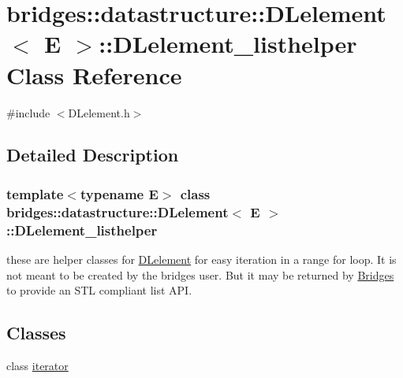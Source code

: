 \hypertarget{classbridges_1_1datastructure_1_1_d_lelement_1_1_d_lelement__listhelper}{}\section{bridges\+:\+:datastructure\+:\+:D\+Lelement$<$ E $>$\+:\+:D\+Lelement\+\_\+listhelper Class Reference}
\label{classbridges_1_1datastructure_1_1_d_lelement_1_1_d_lelement__listhelper}


{\ttfamily \#include $<$D\+Lelement.\+h$>$}



\subsection{Detailed Description}
\subsubsection*{template$<$typename E$>$\newline
class bridges\+::datastructure\+::\+D\+Lelement$<$ E $>$\+::\+D\+Lelement\+\_\+listhelper}

these are helper classes for \hyperlink{classbridges_1_1datastructure_1_1_d_lelement}{D\+Lelement} for easy iteration in a range for loop. It is not meant to be created by the bridges user. But it may be returned by \hyperlink{classbridges_1_1_bridges}{Bridges} to provide an S\+TL compliant list A\+PI. \subsection*{Classes}
\begin{DoxyCompactItemize}
\item 
class \hyperlink{classbridges_1_1datastructure_1_1_d_lelement_1_1_d_lelement__listhelper_1_1iterator}{iterator}
\end{DoxyCompactItemize}
